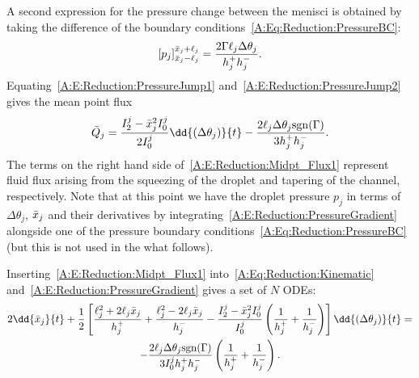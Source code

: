 \begin{subappendices}
 A second expression for the pressure change between the menisci is obtained by taking the difference of the boundary conditions~\eqref{A:Eq:Reduction:PressureBC}:
\begin{equation}\label{A:E:Reduction:PressureJump2}
\left[p_j\right]^{\bar{x}_j + \ell_j}_{\bar{x}_j - \ell_j}=\frac{2 \Gamma\ell_j \Delta \theta_j}{h_j^+ h_j^-}.
\end{equation}
Equating~\eqref{A:E:Reduction:PressureJump1} and~\eqref{A:E:Reduction:PressureJump2} gives the mean point flux
\begin{equation}\label{A:E:Reduction:Midpt_Flux1}
\bar{Q}_j = \frac{I_2^j - \xbar_j^2 I_0^j}{2I_0^j}\dd{(\dthetaj)}{t} - \frac{2\ell_j \dthetaj \sgn (\Gamma)}{3h_j^+ h_j^-}.
\end{equation}
 The terms on the right hand side of~\eqref{A:E:Reduction:Midpt_Flux1} represent fluid flux arising from the squeezing of the droplet and tapering of the channel, respectively. Note that at this point we have the droplet pressure $p_j$ in terms of $\Delta \theta_j$, $\bar{x}_j$ and their derivatives by integrating~\eqref{A:E:Reduction:PressureGradient} alongside one of the pressure boundary conditions~\eqref{A:Eq:Reduction:PressureBC} (but this is not used in the what follows).

Inserting~\eqref{A:E:Reduction:Midpt_Flux1} into~\eqref{A:Eq:Reduction:Kinematic} and~\eqref{A:E:Reduction:PressureGradient} gives a set of $N$ ODEs:
\begin{multline}\label{A:Eq:Reduction:ODESet1}
2\dd{\xbarj}{t}  +\frac{1}{2} \left[\frac{\ellj^2 + 2\ellj \xbarj}{h_j^+} + \frac{\ellj^2 - 2\ellj \xbarj}{h_j^-} -  \frac{I_2^j - \xbar_j^2 I_0^j}{I_0^j} \left(\frac{1}{h_j^+} + \frac{1}{h_j^-}\right)\right]\dd{(\dthetaj)}{t} =\\
-\frac{2\ellj\dthetaj\sgn(\Gamma)}{3I_0^j h_j^+ h_j^-} \left(\frac{1}{h_j^+} + \frac{1}{h_j^-}\right).
\end{multline}


\end{subappendices}
